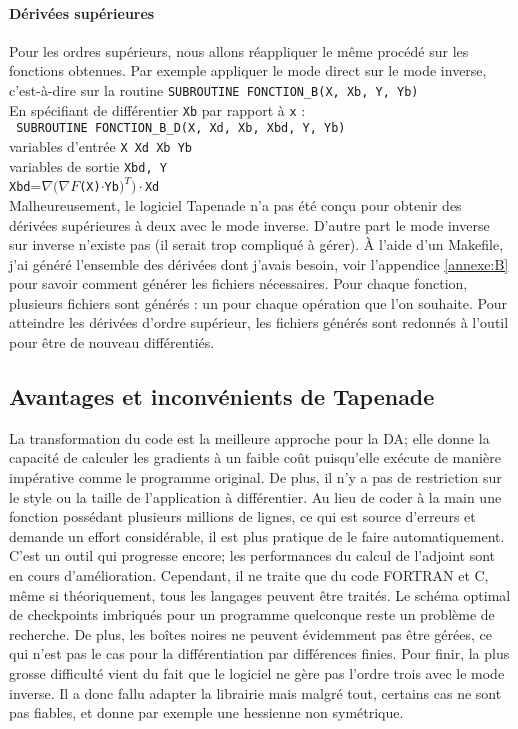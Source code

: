 \paragraph{D\'eriv\'ees sup\'erieures} 
Pour les ordres sup\'erieurs, nous allons r\'eappliquer le même proc\'ed\'e sur les fonctions obtenues. Par exemple appliquer le mode direct sur 
le mode inverse, c'est-\`a-dire sur la routine \verb!SUBROUTINE FONCTION_B(X, Xb, Y, Yb)!\\
En sp\'ecifiant de diff\'erentier {\tt Xb} par rapport \`a {\tt x} : \\
\verb! SUBROUTINE FONCTION_B_D(X, Xd, Xb, Xbd, Y, Yb)!\\
variables d'entr\'ee \verb!X Xd Xb Yb!\\
variables de sortie \verb!Xbd, Y!\\
{\tt Xbd}=$\nabla(\nabla F${\tt (X)}$\cdot${\tt Yb}$)^T)\cdot${\tt Xd}\\



Malheureusement, le logiciel Tapenade n'a pas \'et\'e conçu pour obtenir des d\'eriv\'ees sup\'erieures \`a deux avec le mode inverse. D'autre
part le mode inverse sur inverse n'existe pas (il serait trop compliqu\'e \`a g\'erer).
\`A l'aide d'un Makefile, j'ai g\'en\'er\'e l'ensemble des d\'eriv\'ees dont j'avais besoin,
 voir l'appendice \ref{annexe:B} pour savoir comment g\'en\'erer les fichiers n\'ecessaires. Pour chaque fonction, 
plusieurs fichiers sont g\'en\'er\'es : un pour chaque op\'eration que l'on souhaite. Pour atteindre les d\'eriv\'ees
d'ordre sup\'erieur, les fichiers g\'en\'er\'es sont redonn\'es \`a l'outil pour être de nouveau diff\'erenti\'es.


    \subsection{Avantages et inconv\'enients de Tapenade}

La transformation du code est la meilleure approche pour la DA; elle donne la capacit\'e de calculer les gradients
\`a un faible coût puisqu'elle ex\'ecute de mani\`ere imp\'erative comme le programme original. De plus, il n'y a pas 
de restriction sur le style ou la taille de l'application \`a diff\'erentier. Au lieu de coder \`a la main une fonction
poss\'edant plusieurs millions de lignes, ce qui est source d'erreurs et demande un effort consid\'erable, il est plus pratique 
de le faire automatiquement. C'est un outil qui progresse encore; les performances du calcul de l'adjoint sont en cours 
d'am\'elioration.
Cependant, il ne traite que du code FORTRAN et C, même si th\'eoriquement, tous les langages peuvent être trait\'es. Le
sch\'ema optimal de checkpoints imbriqu\'es pour un programme quelconque reste un probl\`eme de recherche.
De plus, les boîtes noires ne peuvent \'evidemment pas être g\'er\'ees, ce qui n'est pas le cas pour la diff\'erentiation par diff\'erences
finies. Pour finir, la plus grosse difficult\'e vient du fait que le logiciel ne g\`ere pas l'ordre trois avec le mode inverse. Il a donc
fallu adapter la librairie mais malgr\'e tout, certains cas ne sont pas fiables, et donne par exemple une hessienne non sym\'etrique.



